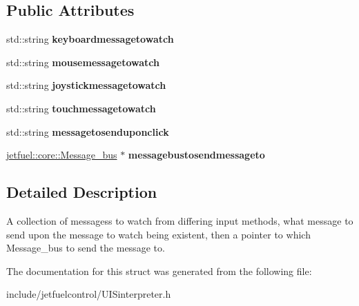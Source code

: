 \subsection*{Public Attributes}
\begin{DoxyCompactItemize}
\item 
\mbox{\label{structjetfuel_1_1control_1_1UIS__input__actions_a83040f4e53a35f6a07692a1a04847c47}} 
std\+::string {\bfseries keyboardmessagetowatch}
\item 
\mbox{\label{structjetfuel_1_1control_1_1UIS__input__actions_a3ae43637e224b5ffef83f6ffaf871412}} 
std\+::string {\bfseries mousemessagetowatch}
\item 
\mbox{\label{structjetfuel_1_1control_1_1UIS__input__actions_ade34234897cbcc27cf42e42e1cbd2cec}} 
std\+::string {\bfseries joystickmessagetowatch}
\item 
\mbox{\label{structjetfuel_1_1control_1_1UIS__input__actions_a798e378cd5e0e848c7900febc79e0375}} 
std\+::string {\bfseries touchmessagetowatch}
\item 
\mbox{\label{structjetfuel_1_1control_1_1UIS__input__actions_a7ae188efdb7fae65e77f45be9ae570e7}} 
std\+::string {\bfseries messagetosenduponclick}
\item 
\mbox{\label{structjetfuel_1_1control_1_1UIS__input__actions_a1bae5b05fb70ad2a275ab026d81319b4}} 
\hyperlink{classjetfuel_1_1core_1_1Message__bus}{jetfuel\+::core\+::\+Message\+\_\+bus} $\ast$ {\bfseries messagebustosendmessageto}
\end{DoxyCompactItemize}


\subsection{Detailed Description}
A collection of messagess to watch from differing input methods, what message to send upon the message to watch being existent, then a pointer to which Message\+\_\+bus to send the message to. 

The documentation for this struct was generated from the following file\+:\begin{DoxyCompactItemize}
\item 
include/jetfuelcontrol/U\+I\+Sinterpreter.\+h\end{DoxyCompactItemize}
